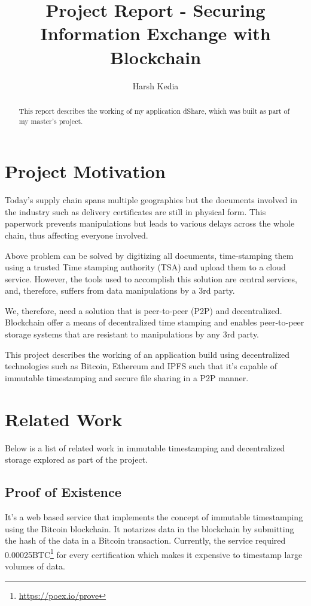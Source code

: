 \documentclass[]{report}
\title{Project Report - Securing Information Exchange with Blockchain}
\author{Harsh Kedia}
\begin{document}
	\maketitle

	\begin{abstract}
		This report describes the working of my application dShare, which was built as part of my master's project.
	\end{abstract}

	\section*{Project Motivation}
		Today's supply chain spans multiple geographies but the documents involved in the industry such as delivery certificates are still in physical form. This paperwork prevents manipulations but leads to various delays across the whole chain, thus affecting everyone involved.
		
		Above problem can be solved by digitizing all documents, time-stamping them using a trusted Time stamping authority (TSA) and upload them to a cloud service. However, the tools used to accomplish this solution are central services, and, therefore, suffers from data manipulations by a 3rd party.
		
		We, therefore, need a solution that is peer-to-peer (P2P) and decentralized. Blockchain offer a means of decentralized time stamping and enables peer-to-peer storage systems that are resistant to manipulations by any 3rd party.
		
		This project describes the working of an application build using decentralized technologies such as Bitcoin, Ethereum and IPFS such that it's capable of immutable timestamping and secure file sharing in a P2P manner.
	
	\section*{Related Work}
		Below is a list of related work in immutable timestamping and decentralized storage explored as part of the project.
		
		\subsection*{Proof of Existence}
			It's a web based service that implements the concept of immutable timestamping using the Bitcoin blockchain. It notarizes data in the blockchain by submitting the hash of the data in a Bitcoin transaction. Currently, the service required 0.00025BTC\footnote{\url{https://poex.io/prove}} for every certification which makes it expensive to timestamp large volumes of data.
			
\end{document}
